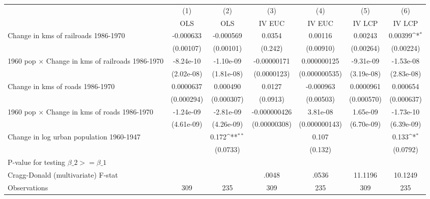 {
\def\sym#1{\ifmmode^{#1}\else\(^{#1}\)\fi}
\begin{tabular}{l*{6}{c}}
\hline\hline
                &\multicolumn{1}{c}{(1)}&\multicolumn{1}{c}{(2)}&\multicolumn{1}{c}{(3)}&\multicolumn{1}{c}{(4)}&\multicolumn{1}{c}{(5)}&\multicolumn{1}{c}{(6)}\\
                &\multicolumn{1}{c}{OLS}&\multicolumn{1}{c}{OLS}&\multicolumn{1}{c}{IV EUC}&\multicolumn{1}{c}{IV EUC}&\multicolumn{1}{c}{IV LCP}&\multicolumn{1}{c}{IV LCP}\\
\hline
Change in kms of railroads 1986-1970&-0.000633         &-0.000569         &   0.0354         &  0.00116         &  0.00243         &  0.00399\sym{*}  \\
                &(0.00107)         &(0.00101)         &  (0.242)         &(0.00910)         &(0.00264)         &(0.00224)         \\
[1em]
1960 pop $\times$ Change in kms of railroads 1986-1970&-8.24e-10         &-1.10e-09         &-0.00000171         &0.000000125         &-9.31e-09         &-1.53e-08         \\
                &(2.02e-08)         &(1.81e-08)         &(0.0000123)         &(0.000000535)         &(3.19e-08)         &(2.83e-08)         \\
[1em]
Change in kms of roads 1986-1970&0.0000637         & 0.000490         &   0.0127         &-0.000963         &0.0000961         & 0.000654         \\
                &(0.000294)         &(0.000307)         & (0.0913)         &(0.00503)         &(0.000570)         &(0.000637)         \\
[1em]
1960 pop $\times$ Change in kms of roads 1986-1970&-1.24e-09         &-2.81e-09         &-0.000000426         & 3.81e-08         & 1.65e-09         &-1.73e-10         \\
                &(4.61e-09)         &(4.26e-09)         &(0.00000308)         &(0.000000143)         &(6.70e-09)         &(6.39e-09)         \\
[1em]
Change in log urban population 1960-1947&                  &    0.172\sym{**} &                  &    0.107         &                  &    0.133\sym{*}  \\
                &                  & (0.0733)         &                  &  (0.132)         &                  & (0.0792)         \\
\hline
P-value for testing $\beta\_{2} >= \beta\_{1}$&                  &                  &                  &                  &                  &                  \\
Cragg-Donald (multivariate) F-stat&                  &                  &    .0048         &    .0536         &  11.1196         &  10.1249         \\
Observations    &      309         &      235         &      309         &      235         &      309         &      235         \\
\hline\hline
\end{tabular}
}
